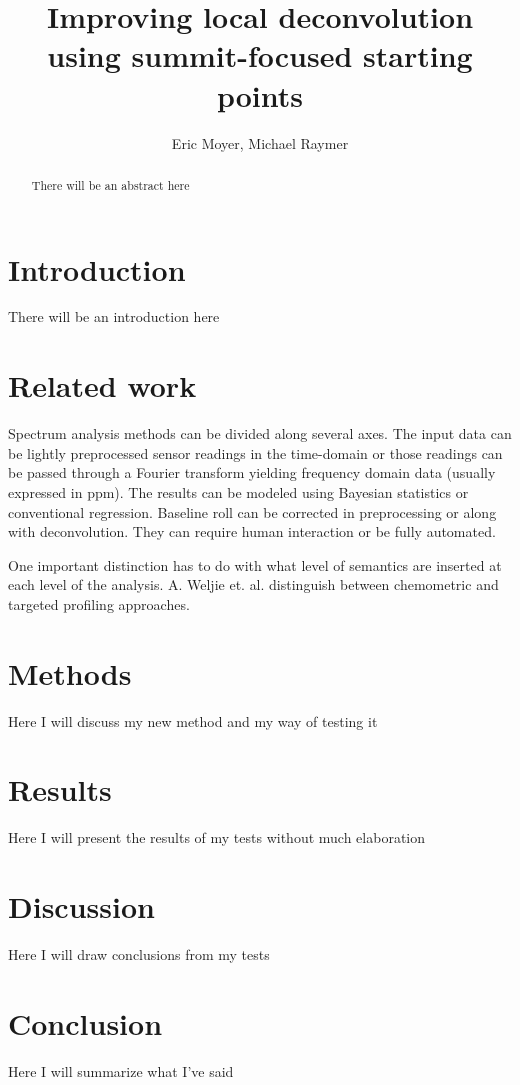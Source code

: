 \documentclass[10pt,letterpaper]{article}
\author{Eric Moyer, Michael Raymer}
\title{Improving local deconvolution using summit-focused starting points}
\begin{document}
\maketitle

\begin{abstract}
There will be an abstract here
\end{abstract}

\section{Introduction}
There will be an introduction here
\section{Related work}
Spectrum analysis methods can be divided along several axes. The input data can be lightly preprocessed sensor readings in the time-domain or those readings can be passed through a Fourier transform yielding frequency domain data (usually expressed in ppm). The results can be modeled using Bayesian statistics or conventional regression. Baseline roll can be corrected in preprocessing or along with deconvolution. They can require human interaction or be fully automated.

One important distinction has to do with what level of semantics are inserted at each level of the analysis. A. Weljie et. al. distinguish between chemometric and targeted profiling approaches\cite{Weljie2006}. 
\section{Methods}
Here I will discuss my new method and my way of testing it
\section{Results}
Here I will present the results of my tests without much elaboration
\section{Discussion}
Here I will draw conclusions from my tests
\section{Conclusion}
Here I will summarize what I've said



\end{document}
